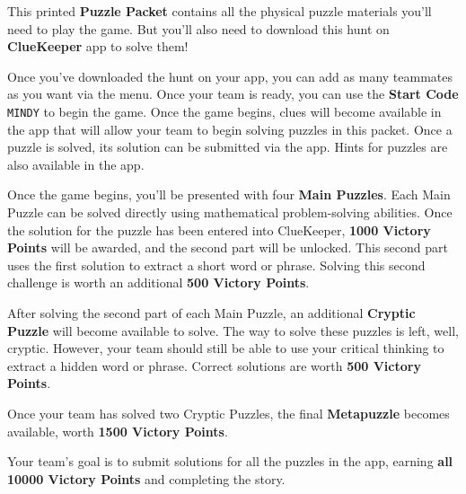 
This printed \textbf{Puzzle Packet} contains all the physical
puzzle materials you'll need to play the game. But you'll
also need to download this hunt on \textbf{ClueKeeper} app to solve them!

Once you've downloaded the hunt on your app, you can add as many teammates
as you want via the menu. Once your team is ready, you can use the
\textbf{Start Code} \texttt{MINDY} to begin the game.
Once the game begins, clues will become available in the app that
will allow your team to begin solving puzzles in this packet. Once a puzzle is
solved, its solution can be submitted via the app. Hints
for puzzles are also available in the app.


Once the game begins, you'll be presented with four \textbf{Main Puzzles}. 
Each Main Puzzle can be solved directly using mathematical 
problem-solving abilities. Once the solution for the puzzle has been
entered into ClueKeeper, \textbf{1000 Victory Points} will be awarded,
and the second part will be unlocked. This second part uses the first
solution to extract a short word or phrase. Solving this second challenge
is worth an additional \textbf{500 Victory Points}.


After solving the second part of each Main Puzzle, an additional
\textbf{Cryptic Puzzle} will become available to solve.
The way to solve these puzzles is left, well,
cryptic. However, your team should still be able to use your
critical thinking to extract a hidden word or phrase. Correct
solutions are worth \textbf{500 Victory Points}.


Once your team has solved two Cryptic Puzzles, the final \textbf{Metapuzzle}
becomes available, worth \textbf{1500 Victory Points}.


Your team's goal is to submit solutions for all the puzzles in the
app, earning \textbf{all 10000 Victory Points} and completing
the story.
